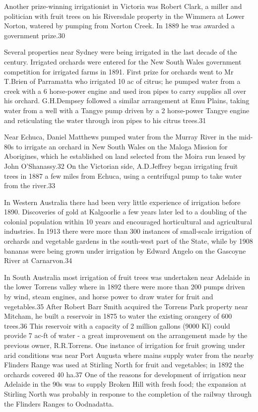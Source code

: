 Another prize-winning irrigationist in Victoria was Robert Clark, a
miller and politician with fruit trees on his Riversdale property in
the Wimmera at Lower Norton, watered by pumping from Norton Creek. In
1889 he was awarded a government prize.30

Several properties near Sydney were being irrigated in the last decade
of the century. Irrigated orchards were entered for the New South
Wales government competition for irrigated farms in 1891. First prize
for orchards went to Mr T.Brien of Parramatta who irrigated 10 ac of
citrus; he pumped water from a creek with a 6 horse-power engine and
used iron pipes to carry supplies all over his orchard. G.H.Dempsey
followed a similar arrangement at Emu Plains, taking water from a well
with a Tangye pump driven by a 2 horse-power Tangye engine and
reticulating the water through iron pipes to his citrus trees.31

 Near Echuca, Daniel Matthews pumped water from the Murray River in
 the mid-80s to irrigate an orchard in New South Wales on the Maloga
 Mission for Aborigines, which he established on land selected from
 the Moira run leased by John O'Shanassy.32 On the Victorian side,
 A.D.Jeffrey began irrigating fruit trees in 1887 a few miles from
 Echuca, using a centrifugal pump to take water from the river.33

In Western Australia there had been very little experience of
irrigation before 1890. Discoveries of gold at Kalgoorlie a few years
later led to a doubling of the colonial population within 10 years and
encouraged horticultural and agricultural industries. In 1913 there
were more than 300 instances of small-scale irrigation of orchards and
vegetable gardens in the south-west part of the State, while by 1908
bananas were being grown under irrigation by Edward Angelo on the
Gascoyne River at Carnarvon.34

In South Australia most irrigation of fruit trees was undertaken near
Adelaide in the lower Torrens valley where in 1892 there were more
than 200 pumps driven by wind, steam engines, and horse power to draw
water for fruit and vegetables.35 After Robert Barr Smith acquired the
Torrens Park property near Mitcham, he built a reservoir in 1875 to
water the existing orangery of 600 trees.36 This reservoir with a
capacity of 2 million gallons (9000 Kl) could provide 7 ac-ft of water
- a great improvement on the arrangement made by the previous owner,
R.R.Torrens. One instance of irrigation for fruit growing under arid
conditions was near Port Augusta where mains supply water from the
nearby Flinders Range was used at Stirling North for fruit and
vegetables; in 1892 the orchards covered 40 ha.37 One of the reasons
for development of irrigation near Adelaide in the 90s was to supply
Broken Hill with fresh food; the expansion at Stirling North was
probably in response to the completion of the railway through the
Flinders Ranges to Oodnadatta.

